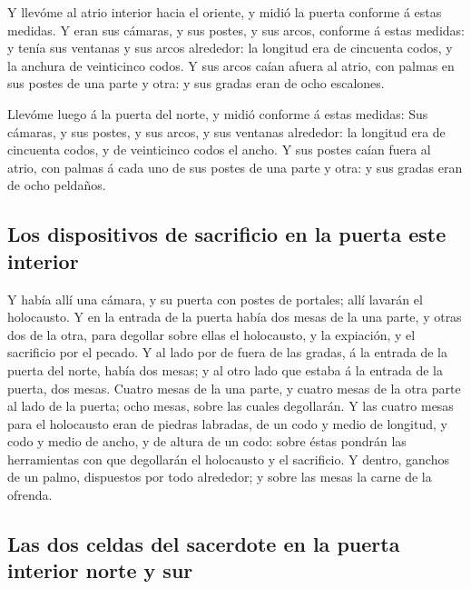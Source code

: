  Y llevóme al atrio interior hacia el oriente, y midió la
puerta conforme á estas medidas.  Y eran sus cámaras, y
sus postes, y sus arcos, conforme á estas medidas: y tenía sus ventanas
y sus arcos alrededor: la longitud era de cincuenta codos, y la anchura
de veinticinco codos.  Y sus arcos caían afuera al atrio,
con palmas en sus postes de una parte y otra: y sus gradas eran de ocho
escalones.

 Llevóme luego á la puerta del norte, y midió conforme á
estas medidas:  Sus cámaras, y sus postes, y sus arcos, y
sus ventanas alrededor: la longitud era de cincuenta codos, y de
veinticinco codos el ancho.  Y sus postes caían fuera al
atrio, con palmas á cada uno de sus postes de una parte y otra: y sus
gradas eran de ocho peldaños.

\hypertarget{los-dispositivos-de-sacrificio-en-la-puerta-este-interior}{%
\subsection{Los dispositivos de sacrificio en la puerta este
interior}\label{los-dispositivos-de-sacrificio-en-la-puerta-este-interior}}

 Y había allí una cámara, y su puerta con postes de
portales; allí lavarán el holocausto.  Y en la entrada de
la puerta había dos mesas de la una parte, y otras dos de la otra, para
degollar sobre ellas el holocausto, y la expiación, y el sacrificio por
el pecado.  Y al lado por de fuera de las gradas, á la
entrada de la puerta del norte, había dos mesas; y al otro lado que
estaba á la entrada de la puerta, dos mesas.  Cuatro
mesas de la una parte, y cuatro mesas de la otra parte al lado de la
puerta; ocho mesas, sobre las cuales degollarán.  Y las
cuatro mesas para el holocausto eran de piedras labradas, de un codo y
medio de longitud, y codo y medio de ancho, y de altura de un codo:
sobre éstas pondrán las herramientas con que degollarán el holocausto y
el sacrificio.  Y dentro, ganchos de un palmo, dispuestos
por todo alrededor; y sobre las mesas la carne de la ofrenda.

\hypertarget{las-dos-celdas-del-sacerdote-en-la-puerta-interior-norte-y-sur}{%
\subsection{Las dos celdas del sacerdote en la puerta interior norte y
sur}\label{las-dos-celdas-del-sacerdote-en-la-puerta-interior-norte-y-sur}}


